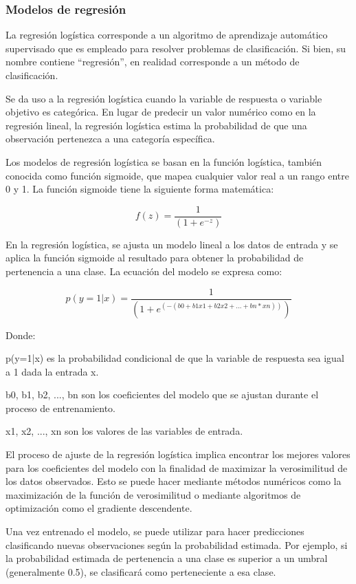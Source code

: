 \subsubsection{Modelos de regresión}
\noindent
La regresión logística corresponde a un algoritmo de aprendizaje automático supervisado que es empleado para resolver problemas de clasificación. Si bien, su nombre contiene “regresión”, en realidad corresponde a un método de clasificación.

Se da uso a la regresión logística cuando la variable de respuesta o variable objetivo es categórica. En lugar de predecir un valor numérico como en la regresión lineal, la regresión logística estima la probabilidad de que una observación pertenezca a una categoría específica.

Los modelos de regresión logística se basan en la función logística, también conocida como función sigmoide, que mapea cualquier valor real a un rango entre 0 y 1. La función sigmoide tiene la siguiente forma matemática:

\begin{equation*}
    f(z) = \frac{1}{(1 + e^{-z})}
\end{equation*}

En la regresión logística, se ajusta un modelo lineal a los datos de entrada y se aplica la función sigmoide al resultado para obtener la probabilidad de pertenencia a una clase. La ecuación del modelo se expresa como:

\begin{equation*}
    p(y=1|x) = \frac{1}{(1 + e^{(-(b0 + b1x1 + b2x2 + ... + bn*xn))})}
\end{equation*}

Donde:

p(y=1|x) es la probabilidad condicional de que la variable de respuesta sea igual a 1 dada la entrada x.

b0, b1, b2, ..., bn son los coeficientes del modelo que se ajustan durante el proceso de entrenamiento.

x1, x2, ..., xn son los valores de las variables de entrada.

El proceso de ajuste de la regresión logística implica encontrar los mejores valores para los coeficientes del modelo con la finalidad de maximizar la verosimilitud de los datos observados. Esto se puede hacer mediante métodos numéricos como la maximización de la función de verosimilitud o mediante algoritmos de optimización como el gradiente descendente.

Una vez entrenado el modelo, se puede utilizar para hacer predicciones clasificando nuevas observaciones según la probabilidad estimada. Por ejemplo, si la probabilidad estimada de pertenencia a una clase es superior a un umbral (generalmente 0.5), se clasificará como perteneciente a esa clase.

